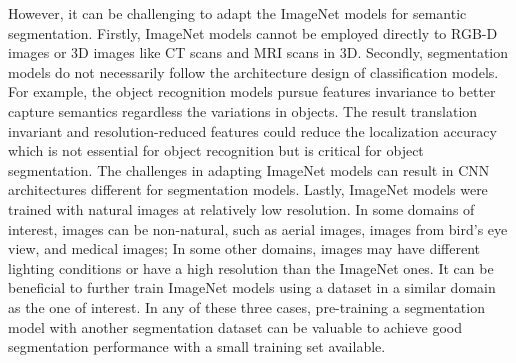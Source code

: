 However, it can be challenging to adapt the ImageNet models for semantic segmentation.
Firstly, ImageNet models cannot be employed directly to RGB-D images or 3D images like CT scans and MRI scans in 3D.
Secondly, segmentation models do not necessarily follow the architecture design of classification models.
For example, the object recognition models pursue features invariance to better capture semantics regardless the variations in objects.
The result translation invariant and resolution-reduced features could reduce the localization accuracy which is not essential for object recognition but is critical for object segmentation.\cite{zheng2015conditional,chen2016deeplab}
The challenges in adapting ImageNet models can result in CNN architectures different for segmentation models\cite{zheng2015conditional}.
Lastly, ImageNet models were trained with natural images at relatively low resolution.
In some domains of interest, images can be non-natural, such as aerial images, images from bird's eye view, and medical images;
In some other domains, images may have different lighting conditions or have a high resolution than the ImageNet ones.
It can be beneficial to further train ImageNet models using a dataset in a similar domain as the one of interest.
In any of these three cases, pre-training a segmentation model with another segmentation dataset can be valuable to achieve good segmentation performance with a small training set available.





